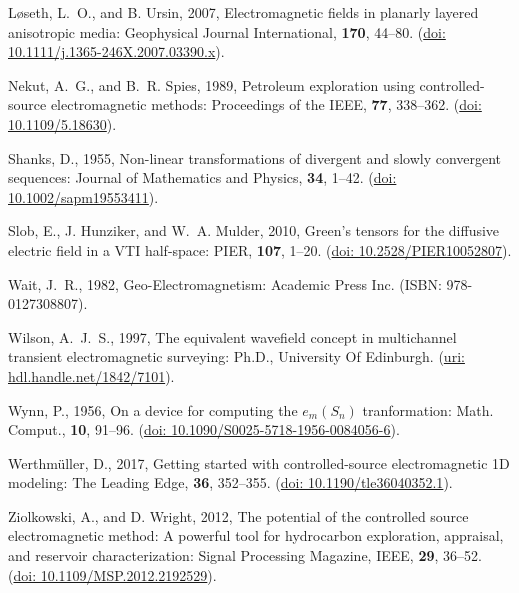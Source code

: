 \documentclass[manuscript,revised]{geophysics}
\begin{document}
\begin{thebibliography}{}
Løseth, L.~O., and B. Ursin,  2007, Electromagnetic fields in planarly layered
  anisotropic media: Geophysical Journal International, {\bf 170}, 44--80.
\newblock (\href{http://dx.doi.org/10.1111/j.1365-246X.2007.03390.x}{doi:
  10.1111/j.1365-246X.2007.03390.x}).

Nekut, A.~G., and B.~R. Spies,  1989, Petroleum exploration using
  controlled-source electromagnetic methods: Proceedings of the IEEE, {\bf 77},
  338--362.
\newblock
  (\href{http://ieeexplore.ieee.org/lpdocs/epic03/wrapper.htm?arnumber=18630}{doi:
  10.1109/5.18630}).

Shanks, D.,  1955, Non-linear transformations of divergent and slowly
  convergent sequences: Journal of Mathematics and Physics, {\bf 34}, 1--42.
\newblock (\href{http://dx.doi.org/10.1002/sapm19553411}{doi:
  10.1002/sapm19553411}).

Slob, E., J. Hunziker, and W.~A. Mulder,  2010, Green's tensors for the
  diffusive electric field in a {VTI} half-space: PIER, {\bf 107}, 1--20.
\newblock (\href{http://dx.doi.org/10.2528/PIER10052807}{doi:
  10.2528/PIER10052807}).

Wait, J.~R.,  1982, Geo-{E}lectromagnetism: Academic Press Inc.
\newblock ({I}SBN: 978-0127308807).

Wilson, A.~J.~S., 1997, The equivalent wavefield concept in multichannel
transient electromagnetic surveying: Ph.D., University Of Edinburgh.
\newblock (\href{http://hdl.handle.net/1842/7101}{uri:
hdl.handle.net/1842/7101}).

Wynn, P.,  1956, {On a device for computing the $e_m(S_n)$ tranformation}:
  Math. Comput., {\bf 10}, 91--96.
\newblock (\href{http://dx.doi.org/10.1090/S0025-5718-1956-0084056-6}{doi:
  10.1090/S0025-5718-1956-0084056-6}).

Werthmüller, D., 2017, Getting started with controlled-source electromagnetic
1D modeling: The Leading Edge, {\bf 36}, 352--355.
\newblock (\href{http://dx.doi.org/10.1190/tle36040352.1}{doi:
  10.1190/tle36040352.1}).

Ziolkowski, A., and D. Wright,  2012, The potential of the controlled source
  electromagnetic method: A powerful tool for hydrocarbon exploration,
  appraisal, and reservoir characterization: Signal Processing Magazine, IEEE,
  {\bf 29}, 36--52.
\newblock (\href{http://dx.doi.org/10.1109/MSP.2012.2192529}{doi:
  10.1109/MSP.2012.2192529}).

\end{thebibliography}
\end{document}
